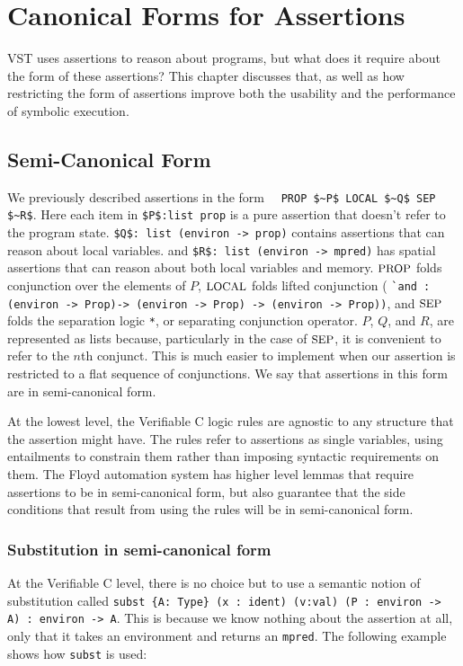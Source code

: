 \documentclass{puthesis}
\begin{document}
\chapter{Canonical Forms for Assertions}

VST uses assertions to reason about programs, but what does 
it require about the form of these assertions? This chapter
discusses that, as well as how restricting the form of
assertions improve both the usability and the performance
of symbolic execution.

\section{Semi-Canonical Form}

We previously described \cite{appel14:plcc} assertions in the form
~~\lstinline{PROP $~P$ LOCAL $~Q$ SEP $~R$}.  Here each item in
\lstinline|$P$:list prop| is a pure assertion that doesn't refer to
the program state. \lstinline|$Q$: list (environ -> prop)| contains
assertions that can reason about local variables.  and 
\lstinline|$R$: list (environ -> mpred)| has spatial assertions that can reason about
both local variables and memory.  $\mbox{\small PROP}$ folds conjunction over the
elements of $P$, $\mbox{\small LOCAL}$ folds lifted conjunction ( 
\lstinline|`and : (environ -> Prop)-> (environ -> Prop) -> (environ -> Prop))|, and
$\mbox{\small SEP}$ folds the separation logic \lstinline|*|, or separating
conjunction operator. $P$, $Q$, and $R$, are represented as lists
because, particularly in the case of $\mbox{\small SEP}$, it is convenient to refer
to the $n$th conjunct. This is much easier to implement when our
assertion is restricted to a flat sequence of conjunctions.  We say
that assertions in this form are in semi-canonical form.

At the lowest level, the Verifiable C logic rules are agnostic to any
structure that the assertion might have. The rules refer to
assertions as single variables, using entailments to constrain them
rather than imposing syntactic requirements on them. The Floyd
automation system has higher level lemmas that require assertions
to be in semi-canonical form, but also guarantee that the side
conditions that result from using the rules will be in semi-canonical
form.

\subsection{Substitution in semi-canonical form}

At the Verifiable C level, there is no choice but to use a semantic
notion of substitution called \linebreak
\lstinline|subst {A: Type} (x : ident) (v:val) (P : environ -> A) : environ -> A|.
This is because we know nothing about the assertion at all, only that
it takes an environment and returns an \lstinline|mpred|. The following example
shows how \lstinline|subst| is used:
\end{document}
